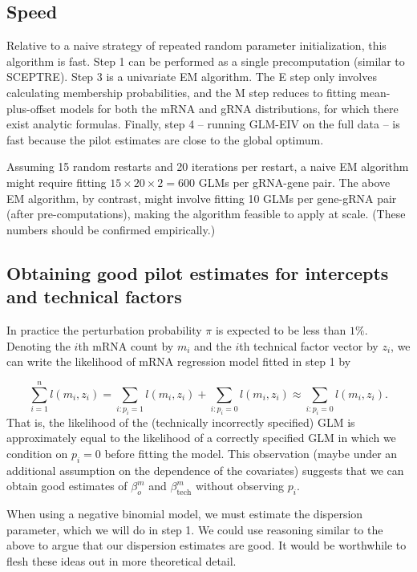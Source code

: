 \documentclass[12pt]{article}
\begin{document}
\subsection{Speed}

Relative to a naive strategy of repeated random parameter initialization, this algorithm is fast. Step 1 can be performed as a single precomputation (similar to SCEPTRE). Step 3 is a univariate EM algorithm. The E step only involves calculating membership probabilities, and the M step reduces to fitting mean-plus-offset models for both the mRNA and gRNA distributions, for which there exist analytic formulas. Finally, step 4 -- running GLM-EIV on the full data -- is fast because the pilot estimates are close to the global optimum.

Assuming 15 random restarts and 20 iterations per restart, a naive EM algorithm might require fitting $15 \times 20 \times 2 = 600$ GLMs per gRNA-gene pair. The above EM algorithm, by contrast, might involve fitting 10 GLMs per gene-gRNA pair (after pre-computations), making the algorithm feasible to apply at scale. (These numbers should be confirmed empirically.)

\subsection{Obtaining good pilot estimates for intercepts and technical factors}
 
 In practice the perturbation probability $\pi$ is expected to be less than $1\%$. Denoting the $i$th mRNA count by $m_i$ and the $i$th technical factor vector by $z_i$, we can write the likelihood of mRNA regression model fitted in step 1 by
 
 $$ \sum_{i=1}^n l(m_i, z_i) = \sum_{i : p_i = 1} l(m_i, z_i) + \sum_{i: p_i = 0} l(m_i, z_i) \approx \sum_{i : p_i = 0} l(m_i, z_i). $$ That is, the likelihood of the (technically incorrectly specified) GLM is approximately equal to the likelihood of a correctly specified GLM in which we condition on $p_i = 0$ before fitting the model. This observation (maybe under an additional assumption on the dependence of the covariates) suggests that we can obtain good estimates of $\beta^m_o$ and $\beta^m_\textrm{tech}$ without observing $p_i$.
 
When using a negative binomial model, we must estimate the dispersion parameter, which we will do in step 1. We could use reasoning similar to the above to argue that our dispersion estimates are good. It would be worthwhile to flesh these ideas out in more theoretical detail.

% 
% 
\end{document}
